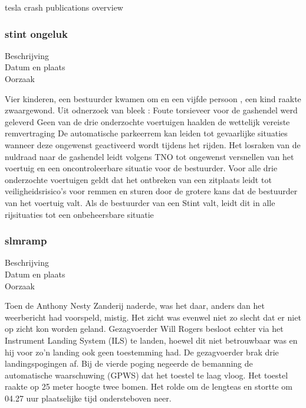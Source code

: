 tesla crash publications overview







\subsubsection{stint ongeluk}

\begin{description}
\item[Beschrijving]
\item[Datum en plaats] 
\item[Oorzaak]
\end{description}
Vier kinderen, een bestuurder kwamen om en een vijfde persoon , een kind raakte zwaargewond. Uit odnerzoek van bleek :
Foute torsieveer voor de gashendel werd geleverd
Geen van de drie onderzochte voertuigen haalden de wettelijk vereiste remvertraging
De automatische parkeerrem kan leiden tot gevaarlijke situaties wanneer deze ongewenst geactiveerd wordt tijdens het rijden. 
Het losraken van de nuldraad naar de gashendel leidt volgens TNO tot ongewenst versnellen van het voertuig en een oncontroleerbare situatie voor de bestuurder.
Voor alle drie onderzochte voertuigen geldt dat het ontbreken van een zitplaats leidt tot veiligheidsrisico’s voor remmen en sturen door de grotere kans dat de bestuurder van het voertuig valt. Als de bestuurder van een Stint valt, leidt dit in alle rijsituaties tot een onbeheersbare situatie


\cite{TNOStint}



\subsubsection{slmramp}

\begin{description}
\item[Beschrijving]
\item[Datum en plaats] 
\item[Oorzaak]
\end{description}
Toen de Anthony Nesty Zanderij naderde, was het daar, anders dan het weerbericht had voorspeld, mistig. Het zicht was evenwel niet zo slecht dat er niet op zicht kon worden geland. Gezagvoerder Will Rogers besloot echter via het Instrument Landing System (ILS) te landen, hoewel dit niet betrouwbaar was en hij voor zo'n landing ook geen toestemming had. De gezagvoerder brak drie landingspogingen af. Bij de vierde poging negeerde de bemanning de automatische waarschuwing (GPWS) dat het toestel te laag vloog. Het toestel raakte op 25 meter hoogte twee bomen. Het rolde om de lengteas en stortte om 04.27 uur plaatselijke tijd ondersteboven neer.

